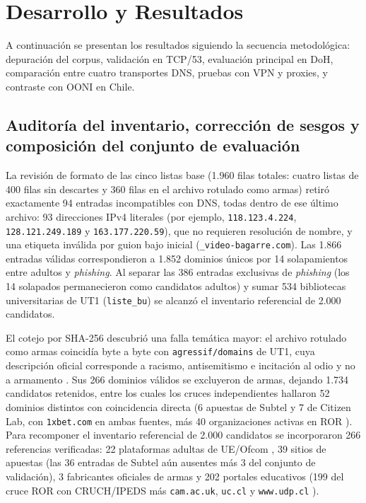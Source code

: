 \documentclass[10pt,a4paper]{article}
\begin{document}
\section{Desarrollo y Resultados}

A continuación se presentan los resultados siguiendo la secuencia metodológica: depuración del corpus, validación en TCP/53, evaluación principal en DoH, comparación entre cuatro transportes DNS, pruebas con VPN y proxies, y contraste con OONI en Chile.

\subsection{Auditoría del inventario, corrección de sesgos y composición del conjunto de evaluación}

La revisión de formato de las cinco listas base (1.960 filas totales: cuatro listas de 400 filas sin descartes y 360 filas en el archivo rotulado como armas) retiró exactamente 94 entradas incompatibles con DNS, todas dentro de ese último archivo: 93 direcciones IPv4 literales (por ejemplo, \texttt{118.123.4.224}, \texttt{128.121.249.189} y \texttt{163.177.220.59}), que no requieren resolución de nombre, y una etiqueta inválida por guion bajo inicial (\texttt{\_video-bagarre.com}). Las 1.866 entradas válidas correspondieron a 1.852 dominios únicos por 14 solapamientos entre adultos y \emph{phishing}. Al separar las 386 entradas exclusivas de \emph{phishing} (los 14 solapados permanecieron como candidatos adultos) y sumar 534 bibliotecas universitarias de UT1 (\texttt{liste\_bu}) se alcanzó el inventario referencial de 2.000 candidatos.

El cotejo por SHA-256 descubrió una falla temática mayor: el archivo rotulado como armas coincidía byte a byte con \texttt{agressif/domains} de UT1, cuya descripción oficial corresponde a racismo, antisemitismo e incitación al odio y no a armamento \cite{ut1}. Sus 266 dominios válidos se excluyeron de armas, dejando 1.734 candidatos retenidos, entre los cuales los cruces independientes hallaron 52 dominios distintos con coincidencia directa (6 apuestas de Subtel y 7 de Citizen Lab, con \texttt{1xbet.com} en ambas fuentes, más 40 organizaciones activas en ROR \cite{subtel2026apuestas,citizenlab2026,ror2026}). Para recomponer el inventario referencial de 2.000 candidatos se incorporaron 266 referencias verificadas: 22 plataformas adultas de UE/Ofcom \cite{ec2025adult,ofcomavs}, 39 sitios de apuestas (las 36 entradas de Subtel aún ausentes más 3 del conjunto de validación), 3 fabricantes oficiales de armas y 202 portales educativos (199 del cruce ROR con CRUCH/IPEDS más \texttt{cam.ac.uk}, \texttt{uc.cl} y \texttt{www.udp.cl} \cite{ror2026,cruchuniversidades,ipeds2024}).
\end{document}
